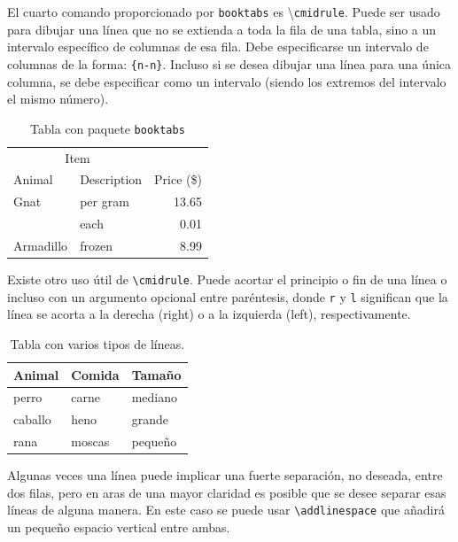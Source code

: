 \documentclass[ 		%
	11pt,				%
	a4paper,			%
	twoside,			%
	openright,			%
	final       		%
]{book}
\begin{document}
El cuarto comando proporcionado por \texttt{booktabs} es \textbackslash \texttt{cmidrule}. Puede ser usado para dibujar una línea que no se extienda a toda la fila de una tabla, sino a un intervalo específico de columnas de esa fila. Debe especificarse un intervalo de columnas de la forma: \texttt{\{n-n\}}. Incluso si se desea dibujar una línea para una única columna, se debe especificar como un intervalo (siendo los extremos del intervalo el mismo número).

\begin{table}[H]
   \centering
   	  \caption{Tabla con paquete \texttt{booktabs}}
   	  \label{tab:booktabs}      
   	  \begin{tabular}{llr}
      \toprule
      \multicolumn{2}{c}{Item} \\
      \cmidrule(r){1-2}
      Animal & Description & Price (\$) \\
      \midrule
      Gnat  & per gram & 13.65 \\
            & each     &  0.01 \\
      Armadillo & frozen & 8.99 \\
      \bottomrule
      \end{tabular}
\end{table}

Existe otro uso útil de \texttt{\textbackslash cmidrule}. Puede acortar el principio o fin de una línea o incluso con un argumento opcional entre paréntesis, donde \texttt{r} y \texttt{l} significan que la línea se acorta a la derecha (right) o a la izquierda (left), respectivamente.

\begin{table}[H]
   \centering
   	  \caption{Tabla con varios tipos de líneas.}
   	  \label{tab:cmidrule}      
    \begin{tabular}{lll}
      \toprule
      Animal  & Comida & Tamaño  \\
      \midrule
      perro   & carne  & mediano \\
      \cmidrule{1-2}
      caballo & heno   & grande  \\
      \cmidrule(r){1-1}
      \cmidrule(rl){2-2}
      \cmidrule(l){3-3}
      rana    & moscas & pequeño \\
      \bottomrule
    \end{tabular}
\end{table}

Algunas veces una línea puede implicar una fuerte separación, no deseada, entre dos filas, pero en aras de una mayor claridad es posible que se desee separar esas líneas de alguna manera. En este caso se puede usar \texttt{\textbackslash addlinespace} que añadirá un pequeño espacio vertical entre ambas.
\end{document}
